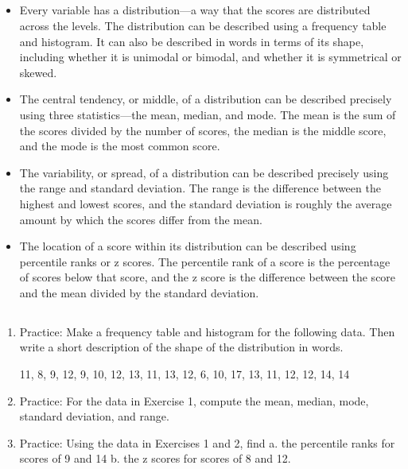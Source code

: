\subsection{}
\begin{fullwidth}
\begin{itemize}
\item Every variable has a distribution---a way that the scores are distributed across the levels. The distribution can be described using a frequency table and histogram. It can also be described in words in terms of its shape, including whether it is unimodal or bimodal, and whether it is symmetrical or skewed.

\item The central tendency, or middle, of a distribution can be described precisely using three statistics---the mean, median, and mode. The mean is the sum of the scores divided by the number of scores, the median is the middle score, and the mode is the most common score.

\item The variability, or spread, of a distribution can be described precisely using the range and standard deviation. The range is the difference between the highest and lowest scores, and the standard deviation is roughly the average amount by which the scores differ from the mean.

\item The location of a score within its distribution can be described using percentile ranks or z scores. The percentile rank of a score is the percentage of scores below that score, and the z score is the difference between the score and the mean divided by the standard deviation. 
\end{itemize}
\end{fullwidth}

 

\subsection{}
\begin{fullwidth}
\begin{enumerate}
\item Practice: Make a frequency table and histogram for the following data. Then write a short description of the shape of the distribution in words.

11, 8, 9, 12, 9, 10, 12, 13, 11, 13, 12, 6, 10, 17, 13, 11, 12, 12, 14, 14
    
\item Practice: For the data in Exercise 1, compute the mean, median, mode, standard deviation, and range.

\item Practice: Using the data in Exercises 1 and 2, find
a. the percentile ranks for scores of 9 and 14 b. the z scores for scores of 8 and 12.

\end{enumerate}
\end{fullwidth}  



